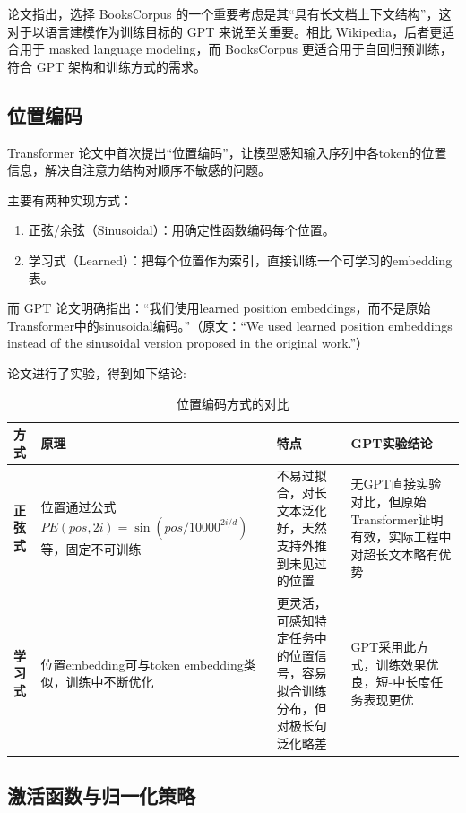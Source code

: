 \documentclass[a4paper,12pt]{article}
\begin{document}
论文指出，选择 BooksCorpus 的一个重要考虑是其“具有长文档上下文结构”，这对于以语言建模作为训练目标的 GPT 来说至关重要。相比 Wikipedia，后者更适合用于 masked language modeling，而 BooksCorpus 更适合用于自回归预训练，符合 GPT 架构和训练方式的需求。


\subsection{位置编码}

Transformer 论文中首次提出“位置编码”，让模型感知输入序列中各token的位置信息，解决自注意力结构对顺序不敏感的问题。

主要有两种实现方式：

\begin{enumerate}
    \item 正弦/余弦（Sinusoidal）：用确定性函数编码每个位置。
    \item 学习式（Learned）：把每个位置作为索引，直接训练一个可学习的embedding表。
\end{enumerate}


而 GPT 论文明确指出：“我们使用learned position embeddings，而不是原始Transformer中的sinusoidal编码。”（原文：“We used learned position embeddings instead of the sinusoidal version proposed in the original work.”）

论文进行了实验，得到如下结论:


\begin{table}[H]
    \centering
    \begin{tabularx}{\textwidth}{|l|X|X|X|}
        \hline
        \textbf{方式} & \textbf{原理} & \textbf{特点} & \textbf{GPT实验结论} \\
        \hline
        \textbf{正弦式} & 位置通过公式 $PE(pos,2i)=\sin(pos/10000^{2i/d})$ 等，固定不可训练 & 不易过拟合，对长文本泛化好，天然支持外推到未见过的位置 & 无GPT直接实验对比，但原始Transformer证明有效，实际工程中对超长文本略有优势 \\
        \hline
        \textbf{学习式} & 位置embedding可与token embedding类似，训练中不断优化 & 更灵活，可感知特定任务中的位置信号，容易拟合训练分布，但对极长句泛化略差 & GPT采用此方式，训练效果优良，短-中长度任务表现更优 \\
        \hline
    \end{tabularx}
    \caption{位置编码方式的对比}
    \label{tab:positional_encoding_comparison}
\end{table}

\subsection{激活函数与归一化策略}
\end{document}
